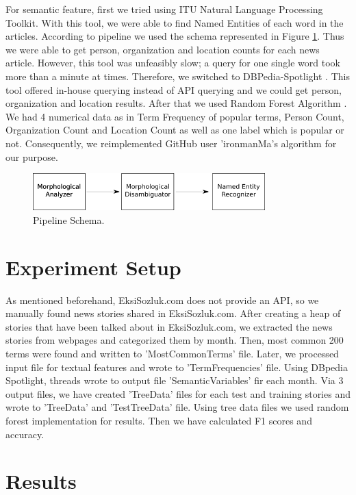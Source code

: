 \documentclass[conference]{IEEEtran}
\begin{document}
For semantic feature, first we tried using ITU Natural Language Processing Toolkit. With this tool, we were able to find Named Entities of each word in the articles. According to pipeline we used the schema represented in Figure \ref{fig_sim}. Thus we were able to get person, organization and location counts for each news article. However, this tool was unfeasibly slow; a query for one single word took more than a minute at times. Therefore, we switched to DBPedia-Spotlight \cite{isem2013daiber}. This tool offered in-house querying instead of API querying and we could get person, organization and location results. After that we used Random Forest Algorithm \cite{random-forest}. We had 4 numerical data as in Term Frequency of popular terms, Person Count, Organization Count and Location Count as well as one label which is popular or not. Consequently, we reimplemented GitHub user 'ironmanMa's algorithm for our purpose.
\begin{figure}[!t]
	\includegraphics[width=0.8\textwidth,natwidth=800,natheight=80]{schema.png}
	\caption{Pipeline Schema.}
	\label{fig_sim}
\end{figure}
\section{Experiment Setup}
As mentioned beforehand, EksiSozluk.com does not provide an API, so we manually found news stories shared in EksiSozluk.com. After creating a heap of stories that have been talked about in EksiSozluk.com, we extracted the news stories from webpages and categorized them by month. Then, most common 200 terms were found and written to 'MostCommonTerms' file. Later, we processed input file for textual features and wrote to 'TermFrequencies' file. Using DBpedia Spotlight, threads wrote to output file 'SemanticVariables' fir each month. Via 3 output files, we have created 'TreeData' files for each test and training stories and wrote to 'TreeData' and 'TestTreeData' file. Using tree data files we used random forest implementation for results. Then we have calculated F1 scores and accuracy.

\section{Results}
\end{document}
